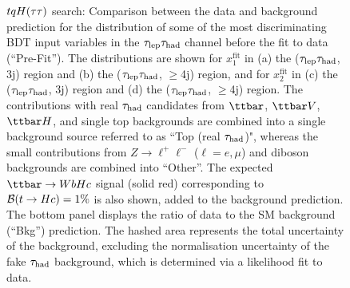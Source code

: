 \begin{figure}[t]
\begin{center}
\caption{$tqH(\tau\tau)$ search: Comparison between the data and background prediction for the distribution of some of the most
discriminating BDT input variables in the $\tau_{\mathrm{lep}} \tau_{\mathrm{had}}$ channel before the fit to data (``Pre-Fit''). The distributions are shown for
$x_{1}^{\text{fit}}$ in (a) the ($\tau_{\mathrm{lep}} \tau_{\mathrm{had}}$, 3j) region and (b) the ($\tau_{\mathrm{lep}} \tau_{\mathrm{had}}$, $\geq$4j) region, and for
$x_{2}^{\text{fit}}$ in (c) the ($\tau_{\mathrm{lep}} \tau_{\mathrm{had}}$, 3j)  region and (d) the ($\tau_{\mathrm{lep}} \tau_{\mathrm{had}}$, $\geq$4j) region.
The contributions with real $\tau_{\mathrm{had}}$ candidates from $\ttbar$,  $\ttbar V$, $\ttbar H$, and single top backgrounds are combined into
a single background source referred to as ``Top (real $\tau_{\mathrm{had}}$)", whereas the small contributions from 
$Z\to \ell^+\ell^-$ ($\ell = e, \mu$) and diboson backgrounds are combined into ``Other''. 
The expected $\Hc$ signal (solid red) corresponding to $\mathcal{B}(t\to Hc)=1\%$ is also shown,
added to the background prediction.
The bottom panel displays the ratio of data to the SM background (``Bkg'') prediction.
The hashed area represents the total uncertainty of the background, excluding the normalisation uncertainty of the fake $\tau_{\mathrm{had}}$ background, 
which is determined via a likelihood fit to data.}
\label{fig:BDT_inputs_lephad_2}
\end{center}
\end{figure}


